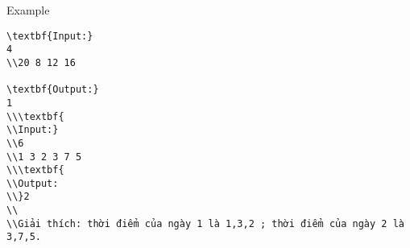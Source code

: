 Example
\begin{verbatim}
\textbf{Input:}
4
\\20 8 12 16

\textbf{Output:}
1
\\\textbf{
\\Input:}
\\6
\\1 3 2 3 7 5
\\\textbf{
\\Output:
\\}2
\\
\\Giải thích: thời điểm của ngày 1 là 1,3,2 ; thời điểm của ngày 2 là 3,7,5.\end{verbatim}